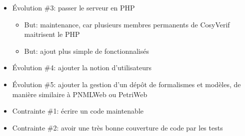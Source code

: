 \documentclass[t, english]{beamer}
\begin{document}
\begin{frame}
{\begin{itemize}
\begin{itemize}
        \item La partie éditeur est en cours de réalisation par un autre
          stagiaire
      \end{itemize}
    \item Évolution \#3: passer le serveur en PHP
      \begin{itemize}
        \item But: maintenance, car plusieurs membres permanents de
          CosyVerif maitrisent le PHP
        \item But: ajout plus simple de fonctionnalisés
      \end{itemize}
    \item Évolution \#4: ajouter la notion d'utilisateurs
    \item Évolution \#5: ajouter la gestion d'un dépôt de formalismes et
      modèles, de manière similaire à PNMLWeb ou PetriWeb
    \item Contrainte \#1: écrire un code maintenable
    \item Contrainte \#2: avoir une très bonne couverture de code par les
      tests
  \end{itemize}
}
\end{frame}
\end{document}
